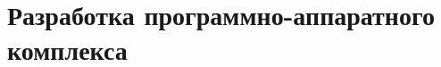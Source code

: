 \documentclass[russian,utf8,pointsection]{eskdtext}
\begin{document}
\maketitle
\tableofcontents

\newpage





\section{Разработка программно-аппаратного комплекса}



\end{document}
